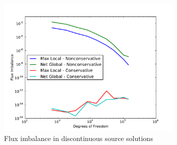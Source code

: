 \documentclass[letterpaper]{article}
\begin{document}
\begin{figure}[p]
\centering
\includegraphics[width=0.8\textwidth]{figs/Discontinuous/modifiedFlux.pdf}
\caption{Flux imbalance in discontinuous source solutions}
\label{fig:discontinuous_flux}
\end{figure}
\end{document}
